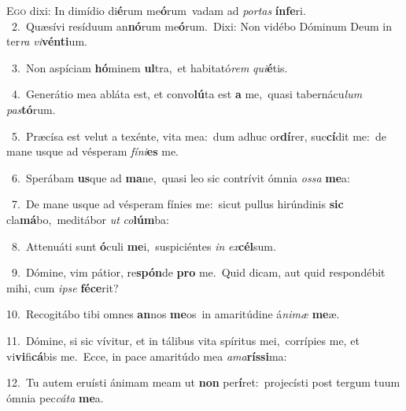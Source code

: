 \lettrine{\initial\textcolor{\initialcolor}{E}}{go} dixi: In dimídio di\-\textbf{é}\-rum me\-\textbf{ó}\-rum~\star vadam ad \textit{por}\-\textit{tas} \textbf{ín}\-\textbf{fe}ri.\\
{\numbfont\textcolor{\numbcolor}{~2.}}~Quæsívi resíduum an\-\textbf{nó}\-rum me\-\textbf{ó}\-rum.~\star Dixi: Non vidébo Dóminum Deum in ter\textit{ra} \textit{vi}\-\textbf{vén}\textbf{ti}um.\par
{\numbfont\textcolor{\numbcolor}{~3.}}~Non aspíciam \textbf{hó}\-minem \textbf{ul}\-tra,~\star et habitató\textit{rem} \textit{qui}\-\textbf{é}tis.\par
{\numbfont\textcolor{\numbcolor}{~4.}}~Generátio mea abláta est, et convo\-\textbf{lú}\-ta est \textbf{a} me,~\star quasi tabernácu\textit{lum} \textit{pas}\-\textbf{tó}rum.\par
{\numbfont\textcolor{\numbcolor}{~5.}}~Præcísa est velut a texénte, vita mea:~\dagger dum adhuc or\-\textbf{dí}\-rer, suc\-\textbf{cí}\-dit me:~\star de mane usque ad vésperam \textit{fí}\-\textit{ni}\textbf{es} me.\par
{\numbfont\textcolor{\numbcolor}{~6.}}~Sperábam \textbf{us}\-que ad \textbf{ma}\-ne,~\star quasi leo sic contrívit ómnia \textit{os}\-\textit{sa} \textbf{me}\-a:\par
{\numbfont\textcolor{\numbcolor}{~7.}}~De mane usque ad vésperam fínies me:~\dagger sicut pullus hirúndinis \textbf{sic} cla\-\textbf{má}\-bo,~\star meditábor \textit{ut} \textit{co}\-\textbf{lúm}ba:\par
{\numbfont\textcolor{\numbcolor}{~8.}}~Attenuáti sunt \textbf{ó}\-culi \textbf{me}\-i,~\star suspiciéntes \textit{in} \textit{ex}\-\textbf{cél}sum.\par
{\numbfont\textcolor{\numbcolor}{~9.}}~Dómine, vim pátior, re\-\textbf{spón}\-de \textbf{pro} me.~\star Quid dicam, aut quid respondébit mihi, cum \textit{ip}\-\textit{se} \textbf{fé}\-\textbf{ce}rit?\par
{\numbfont\textcolor{\numbcolor}{10.}}~Recogitábo tibi omnes \textbf{an}\-nos \textbf{me}\-os~\star in amaritúdine á\-\textit{ni}\-\textit{mæ} \textbf{me}\-æ.\par
{\numbfont\textcolor{\numbcolor}{11.}}~Dómine, si sic vívitur, et in tálibus vita spíritus mei,~\dagger corrípies me, et vi\-\textbf{vi}\-fi\-\textbf{cá}\-bis me.~\star Ecce, in pace amaritúdo mea \textit{a}\-\textit{ma}\textbf{rís}\textbf{si}ma:\par
{\numbfont\textcolor{\numbcolor}{12.}}~Tu autem eruísti ánimam meam ut \textbf{non} per\-\textbf{í}\-ret:~\star projecísti post tergum tuum ómnia pec\-\textit{cá}\-\textit{ta} \textbf{me}\-a.\par
